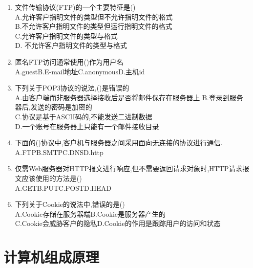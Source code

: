 \documentclass[12pt, a4paper, oneside, UTF8]{ctexbook}
\begin{document}
\begin{enumerate}
    \item 文件传输协议(FTP)的一个主要特征是() \\
    A.允许客户指明文件的类型但不允许指明文件的格式 \\
    B.不允许客户指明文件的类型但运行指明文件的格式 \\
    C.允许客户指明文件的类型与格式 \\
    D. 不允许客户指明文件的类型与格式 

    \item 匿名FTP访问通常使用()作为用户名 \\
    A.guest\qquad B.E-mail地址\qquad C.anonymous\qquad D.主机id

    \item 下列关于POP3协议的说法,()是错误的 \\
    A.由客户端而非服务器选择接收后是否将邮件保存在服务器上
    B.登录到服务器后,发送的密码是加密的 \\
    C.协议是基于ASCII码的,不能发送二进制数据 \\
    D.一个账号在服务器上只能有一个邮件接收目录 

    \item 下面的()协议中,客户机与服务器之间采用面向无连接的协议进行通信. \\
    A.FTP\qquad B.SMTP\qquad C.DNS\qquad D.http

    \item 仅需Web服务器对HTTP报文进行响应,但不需要返回请求对象时,HTTP请求报文应该使用的方法是() \\
    A.GET\qquad B.PUT\qquad C.POST\qquad D.HEAD

    \item 下列关于Cookie的说法中,错误的是() \\
    A.Cookie存储在服务器端\qquad B.Cookie是服务器产生的\\
    C.Cookie会威胁客户的隐私\qquad D.Cookie的作用是跟踪用户的访问和状态
\end{enumerate}


\newpage
\section{计算机组成原理}
\end{document}
